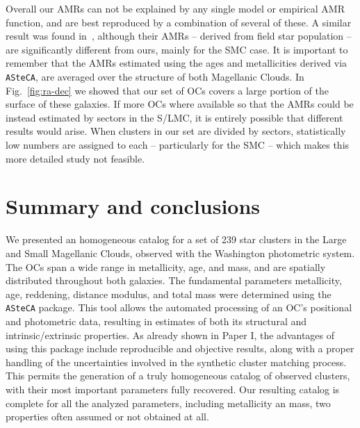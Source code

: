 \documentclass{aa}
\begin{document}
Overall our AMRs can not be explained by any single model or empirical AMR
function, and are best reproduced by a combination of several of these. A
similar result was found in~\cite{Piatti_Geisler_2013}, although their AMRs --
derived from field star population -- are significantly different from ours,
mainly for the SMC case.
%
It is important to remember that the AMRs estimated using the ages and
metallicities derived via \texttt{ASteCA}, are averaged over the structure of
both Magellanic Clouds. In Fig.~\ref{fig:ra-dec} we showed that our set of OCs
covers a large portion of the surface of these galaxies.
%
If more OCs where available so that the AMRs could be instead
estimated by sectors in the S/LMC, it is entirely possible that different
results would arise. When clusters in our set are divided by sectors,
statistically low numbers are assigned to each -- particularly for the SMC --
which makes this more detailed study not feasible.





\section{Summary and conclusions}
\label{sec:summ-concl}

We presented an homogeneous catalog for a set of 239 star clusters in the
Large and Small Magellanic Clouds, observed with the Washington photometric
system. The OCs span a wide range in metallicity, age, and mass, and are
spatially distributed throughout both galaxies.
%
The fundamental parameters metallicity, age, reddening, distance modulus, and
total mass were determined using the \texttt{ASteCA} package.
%
This tool allows the automated processing of an OC's positional and photometric
data, resulting in estimates of both its structural and intrinsic/extrinsic
properties.
%
As already shown in Paper I, the advantages of using this package include
reproducible and objective results, along with a proper handling of the
uncertainties involved in the synthetic cluster matching process.
%
This permits the generation of a truly homogeneous catalog of observed
clusters, with their most important parameters fully recovered.
%
Our resulting catalog is complete for all the analyzed parameters, including
metallicity an mass, two properties often assumed or not obtained at all.
\end{document}
